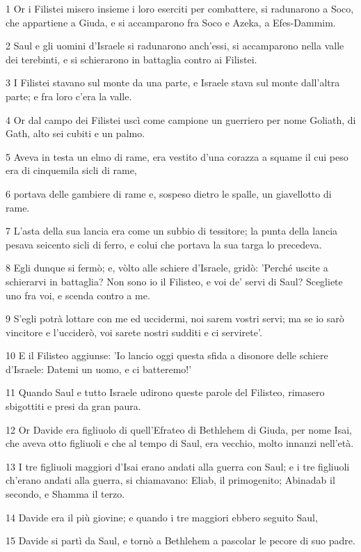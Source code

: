\par 1 Or i Filistei misero insieme i loro eserciti per combattere, si radunarono a Soco, che appartiene a Giuda, e si accamparono fra Soco e Azeka, a Efes-Dammim.
\par 2 Saul e gli uomini d'Israele si radunarono anch'essi, si accamparono nella valle dei terebinti, e si schierarono in battaglia contro ai Filistei.
\par 3 I Filistei stavano sul monte da una parte, e Israele stava sul monte dall'altra parte; e fra loro c'era la valle.
\par 4 Or dal campo dei Filistei uscì come campione un guerriero per nome Goliath, di Gath, alto sei cubiti e un palmo.
\par 5 Aveva in testa un elmo di rame, era vestito d'una corazza a squame il cui peso era di cinquemila sicli di rame,
\par 6 portava delle gambiere di rame e, sospeso dietro le spalle, un giavellotto di rame.
\par 7 L'asta della sua lancia era come un subbio di tessitore; la punta della lancia pesava seicento sicli di ferro, e colui che portava la sua targa lo precedeva.
\par 8 Egli dunque si fermò; e, vòlto alle schiere d'Israele, gridò: 'Perché uscite a schierarvi in battaglia? Non sono io il Filisteo, e voi de' servi di Saul? Scegliete uno fra voi, e scenda contro a me.
\par 9 S'egli potrà lottare con me ed uccidermi, noi sarem vostri servi; ma se io sarò vincitore e l'ucciderò, voi sarete nostri sudditi e ci servirete'.
\par 10 E il Filisteo aggiunse: 'Io lancio oggi questa sfida a disonore delle schiere d'Israele: Datemi un uomo, e ci batteremo!'
\par 11 Quando Saul e tutto Israele udirono queste parole del Filisteo, rimasero sbigottiti e presi da gran paura.
\par 12 Or Davide era figliuolo di quell'Efrateo di Bethlehem di Giuda, per nome Isai, che aveva otto figliuoli e che al tempo di Saul, era vecchio, molto innanzi nell'età.
\par 13 I tre figliuoli maggiori d'Isai erano andati alla guerra con Saul; e i tre figliuoli ch'erano andati alla guerra, si chiamavano: Eliab, il primogenito; Abinadab il secondo, e Shamma il terzo.
\par 14 Davide era il più giovine; e quando i tre maggiori ebbero seguito Saul,
\par 15 Davide si partì da Saul, e tornò a Bethlehem a pascolar le pecore di suo padre.
